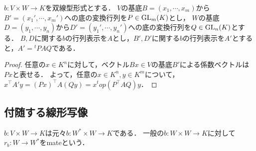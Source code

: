 \documentclass[uplatex,dvipdfmx]{jsreport}
\begin{document}
\begin{proposition}[双線型形式の行列表示の基底変換]
    $b:V\times W\to K$を双線型形式とする．
    $V$の基底$B=(x_1,\cdots,x_m)$から$B'=(x_1',\cdots,x_m')$への底の変換行列を$P\in\mathrm{GL}_m(K)$とし，
    $W$の基底$D=(y_1,\cdots,y_n)$から$D'=(y_1',\cdots,y_n')$への底の変換行列を$Q\in\mathrm{GL}_n(K)$とする．
    $B,D$に関する$b$の行列表示を$A$とし，$B',D'$に関する$b$の行列表示を$A'$とすると，$A'={}^t\!PAQ$である．
\end{proposition}
\begin{proof}
    任意の$x\in K^n$に対して，ベクトル$Bx\in V$の基底$B'$による係数ベクトルは$Px$と表せる．
    よって，任意の$x\in K^n,y\in K^m$について，$x^\top A'y=(Px)^\top A(Qy)=x^top(P^\top AQ)y$．
\end{proof}

\subsection{付随する線形写像}

\begin{tcolorbox}[colframe=ForestGreen, colback=ForestGreen!10!white, breakable]
    $b:V\times W\to K$は元々$b:W^*\times W\to K$である．
    一般の$b:W\times W\to K$に対して$r_b:W\to W^*$をmateという．
\end{tcolorbox}
\end{document}
